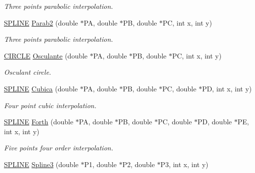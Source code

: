 \begin{DoxyCompactItemize}
\begin{DoxyCompactList}\small\item\em Three points parabolic interpolation. \end{DoxyCompactList}\item 
\hyperlink{structSPLINE}{S\+P\+L\+I\+NE} \hyperlink{classMatematica_a000dcbdd9b1b4f62dd4c4b2fc19ff300}{Parab2} (double $\ast$PA, double $\ast$PB, double $\ast$PC, int x, int y)\hypertarget{classMatematica_a000dcbdd9b1b4f62dd4c4b2fc19ff300}{}\label{classMatematica_a000dcbdd9b1b4f62dd4c4b2fc19ff300}

\begin{DoxyCompactList}\small\item\em Three points parabolic interpolation. \end{DoxyCompactList}\item 
\hyperlink{structCIRCLE}{C\+I\+R\+C\+LE} \hyperlink{classMatematica_a40a33aaca86667162b5772e49e969d56}{Osculante} (double $\ast$PA, double $\ast$PB, double $\ast$PC, int x, int y)\hypertarget{classMatematica_a40a33aaca86667162b5772e49e969d56}{}\label{classMatematica_a40a33aaca86667162b5772e49e969d56}

\begin{DoxyCompactList}\small\item\em Osculant circle. \end{DoxyCompactList}\item 
\hyperlink{structSPLINE}{S\+P\+L\+I\+NE} \hyperlink{classMatematica_acc21ee420953fcc9d0587f56324631cb}{Cubica} (double $\ast$PA, double $\ast$PB, double $\ast$PC, double $\ast$PD, int x, int y)\hypertarget{classMatematica_acc21ee420953fcc9d0587f56324631cb}{}\label{classMatematica_acc21ee420953fcc9d0587f56324631cb}

\begin{DoxyCompactList}\small\item\em Four point cubic interpolation. \end{DoxyCompactList}\item 
\hyperlink{structSPLINE}{S\+P\+L\+I\+NE} \hyperlink{classMatematica_a7eb694853e69b9cbd2020788e9665424}{Forth} (double $\ast$PA, double $\ast$PB, double $\ast$PC, double $\ast$PD, double $\ast$PE, int x, int y)\hypertarget{classMatematica_a7eb694853e69b9cbd2020788e9665424}{}\label{classMatematica_a7eb694853e69b9cbd2020788e9665424}

\begin{DoxyCompactList}\small\item\em Five points four order interpolation. \end{DoxyCompactList}\item 
\hyperlink{structSPLINE}{S\+P\+L\+I\+NE} \hyperlink{classMatematica_a69f1211856d5b0cd58178a21156d0492}{Spline3} (double $\ast$P1, double $\ast$P2, double $\ast$P3, int x, int y)\hypertarget{classMatematica_a69f1211856d5b0cd58178a21156d0492}{}\label{classMatematica_a69f1211856d5b0cd58178a21156d0492}


\end{DoxyCompactItemize}
